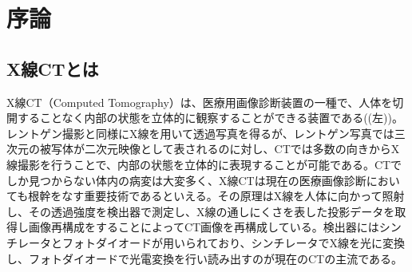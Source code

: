 \chapter{序論}

\section{X線CTとは}
X線CT（Computed Tomography）は、医療用画像診断装置の一種で、人体を切開することなく内部の状態を立体的に観察することができる装置である((左))。レントゲン撮影と同様にX線を用いて透過写真を得るが、レントゲン写真では三次元の被写体が二次元映像として表されるのに対し、CTでは多数の向きからX線撮影を行うことで、内部の状態を立体的に表現することが可能である。CTでしか見つからない体内の病変は大変多く、X線CTは現在の医療画像診断においても根幹をなす重要技術であるといえる。その原理はX線を人体に向かって照射し、その透過強度を検出器で測定し、X線の通しにくさを表した投影データを取得し画像再構成をすることによってCT画像を再構成している。検出器にはシンチレータとフォトダイオードが用いられており、シンチレータでX線を光に変換し、フォトダイオードで光電変換を行い読み出すのが現在のCTの主流である。
\vspace{0.5cm}
